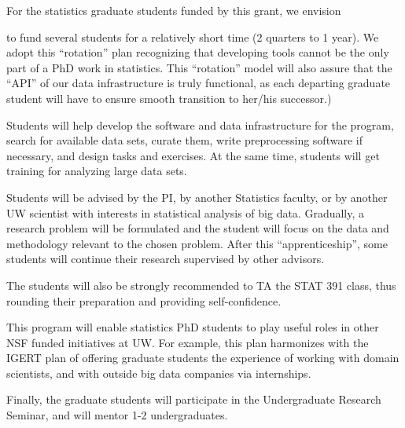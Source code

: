 For the statistics graduate students funded by this grant, we envision 
\bits
\item to fund several students for a relatively short time (2 quarters
  to 1 year). We adopt this ``rotation'' plan recognizing that developing 
tools cannot be the only part of a PhD work in statistics. 
This ``rotation'' model will also assure that the ``API'' of our data
infrastructure is truly functional, as each departing graduate student 
will have to ensure smooth transition to her/his successor.)
\item Students will help develop the software and data infrastructure for
  the program, search for available data sets, curate them, write
  preprocessing software if necessary, and design tasks and exercises. 
  At the same time, students will get training for analyzing large data sets. 
\item Students will be advised by the PI, by another Statistics faculty, or by another UW scientist with interests in statistical analysis of big data. Gradually, a research problem will be formulated and the student will
focus on the data and methodology relevant to the chosen problem. After this ``apprenticeship'', 
some students will continue their research supervised by other advisors. 
\item The students will also be strongly recommended to TA the STAT 391 class, thus rounding their preparation and providing self-confidence. 
\item This program will enable statistics PhD students to play useful roles in other NSF funded initiatives at UW. For 
example, this plan harmonizes with the IGERT plan of offering graduate students the experience of working with domain scientists, and with outside big data companies via internships. 
\item Finally, the graduate students will participate in the Undergraduate Research Seminar, and will mentor 1-2 undergraduates. 
 \eits


